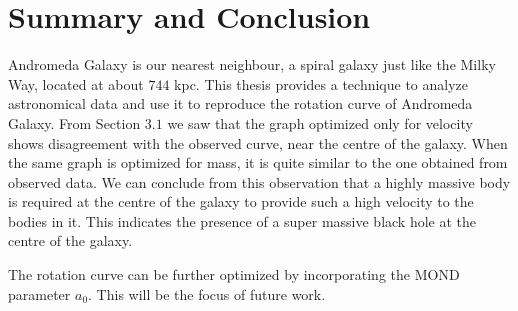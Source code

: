 \chapter{Summary and Conclusion}

Andromeda Galaxy is our nearest neighbour, a spiral galaxy just like the Milky Way, located at about $744$ kpc. This thesis provides a technique to analyze astronomical data and use it to reproduce the rotation curve of Andromeda Galaxy. From Section $3.1$ we saw that the graph optimized only  for velocity shows disagreement with the observed curve, near the centre of the galaxy. When the same graph is optimized for mass, it is quite similar to the one obtained from observed data. We can conclude from this observation that a highly massive body is required at the centre of the galaxy to provide such a high velocity to the bodies in it. This indicates the presence of a super massive black hole at the centre of the galaxy. 

The rotation curve can be further optimized by incorporating the MOND parameter $a_0$. This will be the focus of future work.